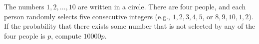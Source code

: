 The numbers $1, 2, \dots, 10$ are written in a circle. There are four people, and each person randomly selects five consecutive integers (e.g., $1, 2, 3, 4, 5$, or $8, 9, 10, 1, 2$). If the probability that there exists some number that is not selected by any of the four people is $p$, compute $10000p$.
